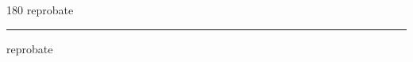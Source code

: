 
\begin{frame}
\begin{center}
\begin{turn}{180}
{\fontsize{2.5cm}{1em}\selectfont reprobate}
\end{turn}
\vspace{1em}\par  
\hrule
\vspace{1em}\par  
{\fontsize{2.5cm}{1em}\selectfont reprobate}
\end{center}
\end{frame}

